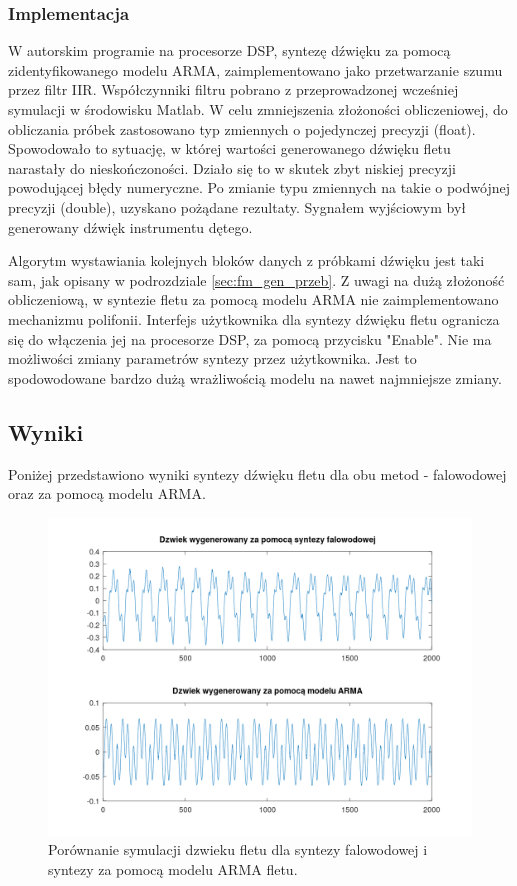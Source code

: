 \subsubsection{Implementacja}
W autorskim programie na procesorze DSP, syntezę dźwięku za pomocą zidentyfikowanego modelu ARMA, zaimplementowano jako przetwarzanie szumu przez filtr IIR. Współczynniki filtru pobrano z przeprowadzonej wcześniej symulacji w środowisku Matlab. 
W celu zmniejszenia złożoności obliczeniowej, do obliczania próbek zastosowano typ zmiennych o pojedynczej precyzji (float). Spowodowało to sytuację, w której wartości generowanego dźwięku fletu narastały do nieskończoności. Działo się to w skutek zbyt niskiej precyzji powodującej błędy numeryczne. Po zmianie typu zmiennych na takie o podwójnej precyzji (double), uzyskano pożądane rezultaty. Sygnałem wyjściowym był generowany dźwięk instrumentu dętego.


Algorytm wystawiania kolejnych bloków danych z próbkami dźwięku jest taki sam, jak opisany w podrozdziale \ref{sec:fm_gen_przeb}. Z uwagi na dużą złożoność obliczeniową, w syntezie fletu za pomocą modelu ARMA nie zaimplementowano mechanizmu polifonii.
Interfejs użytkownika dla syntezy dźwięku fletu ogranicza się do włączenia jej na procesorze DSP, za pomocą przycisku "Enable". Nie ma możliwości zmiany parametrów syntezy przez użytkownika. Jest to spodowodowane bardzo dużą wrażliwością modelu na nawet najmniejsze zmiany.

\subsection{Wyniki}
Poniżej przedstawiono wyniki syntezy dźwięku fletu dla obu metod - falowodowej oraz  za pomocą modelu ARMA.

\begin{figure}[H]
	\centering
	\includegraphics[width=12cm]{grafiki/flute_porownanie_syntez_symulacja}
	\captionsetup{justification=centering}
	\caption{Porównanie symulacji dzwieku fletu dla syntezy falowodowej i syntezy za pomocą modelu ARMA fletu.}
	\label{rys:por_synt_flet}
\end{figure}

